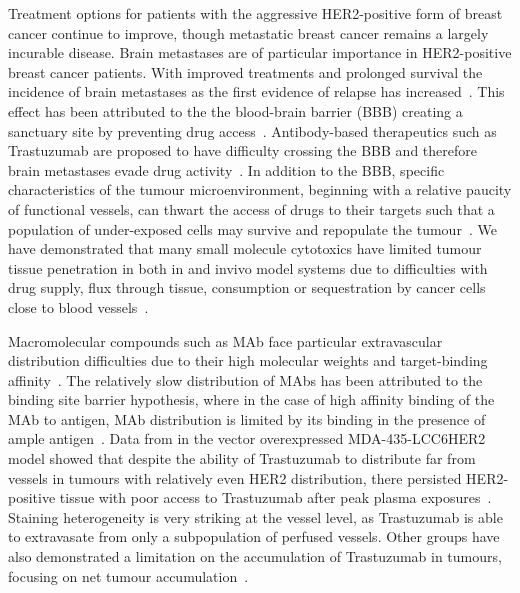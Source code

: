 Treatment options for patients with the aggressive \acs{HER2}-positive form of breast cancer continue to improve, though metastatic breast cancer remains a largely incurable disease.
Brain metastases are of particular importance in \acs{HER2}-positive breast cancer patients.
With improved treatments and prolonged survival the incidence of brain metastases as the first evidence of relapse has increased~\cite{Seal:2012cn,Bria:2007gc}.
This effect has been attributed to the the blood-brain barrier (\acs{BBB}) creating a sanctuary site by preventing drug access~\cite{Kaplan:2014es,Lai:2004bd}.
Antibody-based therapeutics such as Trastuzumab are proposed to have difficulty crossing the \acs{BBB} and therefore brain metastases evade drug activity~\cite{Seal:2012cn,Murrell:2015bz,Stemmler:2006}.
In addition to the \acs{BBB}, specific characteristics of the tumour microenvironment, beginning with a relative paucity of functional vessels, can thwart the access of drugs to their targets such that a population of under-exposed cells may survive and repopulate the tumour~\cite{Minchinton:2006gs}.
We have demonstrated that many small molecule cytotoxics have limited tumour tissue penetration in both in and in\added{-}vivo model systems due to difficulties with drug supply, flux through tissue, consumption or sequestration by cancer cells close to blood vessels~\cite{Kyle:2014cy,Kyle:2007ch,Huxham:2004hm,Kyle:2004fo,Kyle:1999kr}.

Macromolecular compounds such as \acs{MAb} face particular extravascular distribution difficulties due to their high molecular weights and target-binding affinity~\cite{Jain:2010ie,Chauhan:2011fi}.
The relatively slow distribution of \acs{MAbs} has been attributed to the binding site barrier hypothesis, where in the case of high affinity binding of the \acs{MAb} to antigen, \acs{MAb} distribution is limited by its binding in the presence of ample antigen~\cite{Juweid:1992ty}.
Data from  in the vector overexpressed MDA-435-LCC6\acs{HER2} model showed that despite the ability of Trastuzumab to distribute far from vessels in tumours with relatively even \acs{HER2} distribution, there persisted \acs{HER2}-positive tissue with poor access to Trastuzumab after peak plasma exposures~\cite{Baker:2008ci}.
Staining heterogeneity is very striking at the vessel level, as Trastuzumab is able to extravasate from only a subpopulation of perfused vessels.
Other groups have also demonstrated a limitation on the accumulation of Trastuzumab in tumours, focusing on net tumour accumulation~\cite{Jain:2010ie,Chauhan:2011fi,Lee:2010gb}.

